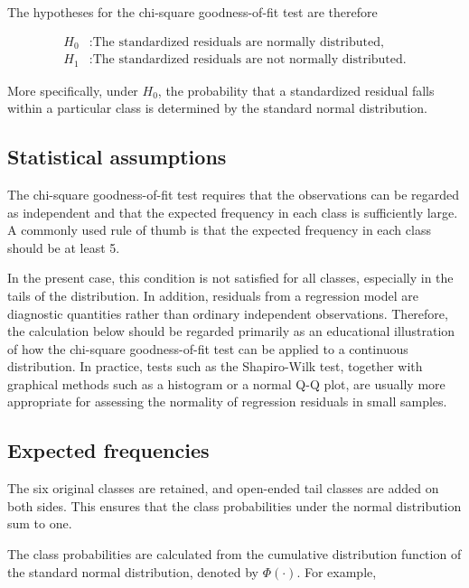 The hypotheses for the chi-square goodness-of-fit test are therefore

\begin{equation*}
\begin{aligned}
H_0 &: \text{The standardized residuals are normally distributed,} \\
H_1 &: \text{The standardized residuals are not normally distributed.}
\end{aligned}
\end{equation*}

More specifically, under $H_0$, the probability that a standardized residual falls within a particular class is determined by the standard normal distribution.

\subsection{Statistical assumptions}

The chi-square goodness-of-fit test requires that the observations can be regarded as independent and that the expected frequency in each class is sufficiently large. A commonly used rule of thumb is that the expected frequency in each class should be at least 5.

In the present case, this condition is not satisfied for all classes, especially in the tails of the distribution. In addition, residuals from a regression model are diagnostic quantities rather than ordinary independent observations. Therefore, the calculation below should be regarded primarily as an educational illustration of how the chi-square goodness-of-fit test can be applied to a continuous distribution. In practice, tests such as the Shapiro-Wilk test, together with graphical methods such as a histogram or a normal Q-Q plot, are usually more appropriate for assessing the normality of regression residuals in small samples.

\subsection{Expected frequencies}

The six original classes are retained, and open-ended tail classes are added on both sides. This ensures that the class probabilities under the normal distribution sum to one.

The class probabilities are calculated from the cumulative distribution function of the standard normal distribution, denoted by $\Phi(\cdot)$. For example,

